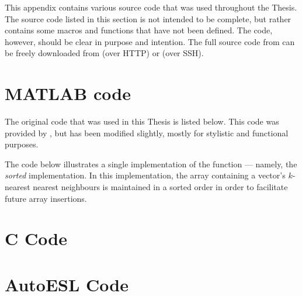 This appendix contains various source code that was used throughout the Thesis.
The source code listed in this section is not intended to be complete, but
rather contains some macros and functions that have not been defined. The code,
however, should be clear in purpose and intention. The full source code from can
be freely downloaded from \gitRepoHTTP{} (over HTTP) or \gitRepoSSH{} (over
SSH).

\section{MATLAB code}
\label{sourceCode:matlab}
The original  code that was used in this Thesis is listed
below. This code was provided by \citeauthor{Khoa:2012}, but has been modified
slightly, mostly for stylistic and functional purposes.

The code below illustrates a single implementation of the
 function --- namely, the \emph{sorted}
implementation. In this implementation, the array containing a vector's
$k$-nearest nearest neighbours is maintained in a sorted order in order to
facilitate future array insertions.



\section{C Code}
\label{sourceCode:c}


\section{AutoESL Code}
\label{sourceCode:autoesl}

